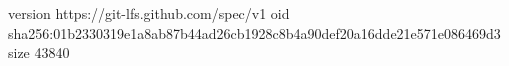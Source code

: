 version https://git-lfs.github.com/spec/v1
oid sha256:01b2330319e1a8ab87b44ad26cb1928c8b4a90def20a16dde21e571e086469d3
size 43840
